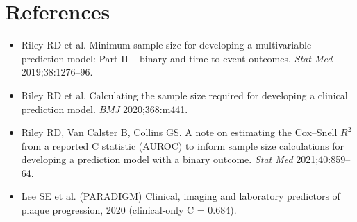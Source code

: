 \documentclass[11pt,a4paper]{article}
\begin{document}
\section*{References}
\begin{itemize}\setlength\itemsep{1pt}\small
  \item Riley RD et al. Minimum sample size for developing a multivariable prediction model:
        Part II -- binary and time-to-event outcomes. \emph{Stat Med} 2019;38:1276--96.
  \item Riley RD et al. Calculating the sample size required for developing a clinical prediction
        model. \emph{BMJ} 2020;368:m441.
  \item Riley RD, Van Calster B, Collins GS. A note on estimating the Cox--Snell $R^2$ from a
        reported C statistic (AUROC) to inform sample size calculations for developing a prediction
        model with a binary outcome. \emph{Stat Med} 2021;40:859--64.
  \item Lee SE et al. (PARADIGM) Clinical, imaging and laboratory predictors of plaque progression,
        2020 (clinical-only C = 0.684).
\end{itemize}
\end{document}
